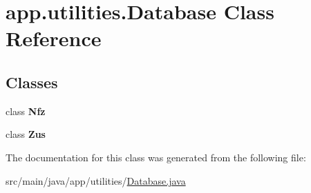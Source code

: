 \hypertarget{classapp_1_1utilities_1_1_database}{}\section{app.\+utilities.\+Database Class Reference}
\label{classapp_1_1utilities_1_1_database}
\subsection*{Classes}
\begin{DoxyCompactItemize}
\item 
class {\bfseries Nfz}
\item 
class {\bfseries Zus}
\end{DoxyCompactItemize}


The documentation for this class was generated from the following file\+:\begin{DoxyCompactItemize}
\item 
src/main/java/app/utilities/\mbox{\hyperlink{_database_8java}{Database.\+java}}\end{DoxyCompactItemize}
